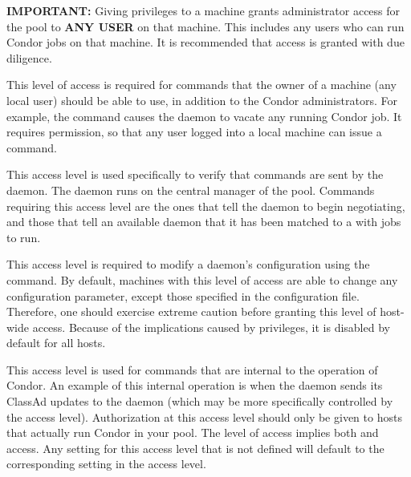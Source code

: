 \begin{description}
   \textbf{IMPORTANT:} Giving  privileges to a machine
   grants administrator access for the pool to
   \textbf{ANY USER} on that machine. This includes any
   users who can run Condor jobs on that machine.
   It is recommended that  access is granted with due diligence.

\item[\DCPerm{OWNER}] \label{dcperm:owner} This level of access is
   required for commands that the owner of a machine (any local user)
   should be able to use, in addition to the Condor administrators.
   For example, the  command causes the
    daemon to vacate any running Condor job.
   It requires  permission,
   so that any user logged into a local machine
   can issue a  command.

\item[\DCPerm{NEGOTIATOR}] \label{dcperm:negotiator} This
   access level is used specifically to verify that commands are
   sent by the  daemon.
   The  daemon runs on the central manager of
   the pool.
   Commands requiring this access
   level are the ones that tell the  daemon to begin
   negotiating, and those that tell an available  daemon
   that it has been matched to a  with jobs to run.

\item[\DCPerm{CONFIG}] \label{dcperm:config} This access level is
   required to modify a daemon's configuration using
   the  command.
   By default, machines with this level of access are able
   to change any configuration parameter, except those specified in
   the  configuration file.
   Therefore, one should exercise extreme caution before
   granting this level of host-wide access.
   Because of the implications caused by  privileges,
   it is disabled by default for all hosts.

\item[\DCPerm{DAEMON}] \label{dcperm:daemon} This access level
   is used for commands that are internal to the operation of
   Condor.  An example of this internal operation is when the
    daemon sends
   its ClassAd updates to the  daemon (which may be
   more specifically controlled by the 
   access level).
   Authorization at this access level should only be given to
   hosts that actually run Condor in your pool.
   The  level of access implies both
    and  access.  Any setting for this access
   level that is not defined will default to the corresponding setting
   in the  access level.


\end{description}

